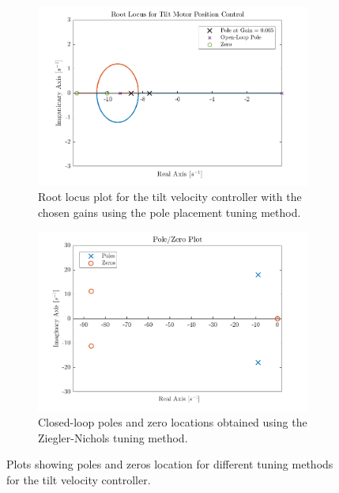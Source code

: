 \documentclass[../../main.tex]{subfiles}
\begin{document}
\begin{figure}[h]
\begin{subfigure}{0.49\textwidth}
    \includegraphics[width = 0.99\textwidth]{Sections/System_Design/Images/RL_TiltMotorVelPolePlace.png}
    \caption{Root locus plot for the tilt velocity controller with the chosen gains using the pole placement tuning method.}
    \label{fig:vel_root_locus}
\end{subfigure}\quad
\begin{subfigure}{0.49\textwidth}
    \includegraphics[width = 0.99\textwidth]{Sections/System_Design/Images/PoleZero_TiltMotorVel_NZ.png}
    \caption{Closed-loop poles and zero locations obtained using the Ziegler-Nichols tuning method.}
    \label{fig:ZN_pole_zero}
\end{subfigure}
\caption{Plots showing poles and zeros location for different tuning methods for the tilt velocity controller.}
\label{fig:vel_poles_zeros}
\end{figure}
\end{document}
